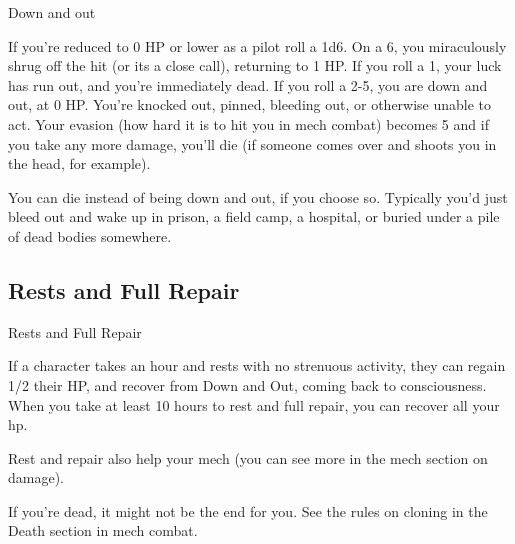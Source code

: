                                                  Down and out 

                                                                                                                 


If you’re reduced to 0 HP or lower as a pilot roll a 1d6. On a 6, you miraculously shrug off the hit  
(or its a close call), returning to 1 HP. If you roll a 1, your luck has run out, and you’re immediately  
dead. If you roll a 2-5, you are down and out, at 0 HP. You’re knocked out, pinned, bleeding out,  
or otherwise unable to act. Your evasion (how hard it is to hit you in mech combat) becomes 5  
and if you take any more damage, you’ll die (if someone comes over and shoots you in the head,  
for example).
 

You can die instead of being down and out, if you choose so. Typically you’d just bleed out and  
wake up in prison, a field camp, a hospital, or buried under a pile of dead bodies somewhere.
 
\subsection{Rests and Full Repair}

                                         Rests and Full Repair  

If a character takes an hour and rests with no strenuous activity, they can regain 1/2 their HP, and  
recover from Down and Out, coming back to consciousness. When you take at least 10 hours to  
rest and full repair, you can recover all your hp.
 

Rest and repair also help your mech (you can see more in the mech section on damage).
 

If you’re dead, it might not be the end for you. See the rules on cloning in the Death section in  
mech combat.
 